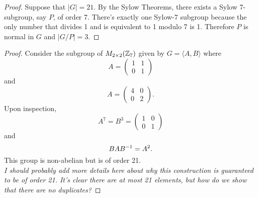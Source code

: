 \documentclass[../../AlgebraQualSolutions.tex]{subfiles}
\begin{document}
	\begin{proof}
	Suppose that $|G| = 21$. By the Sylow Theorems, there exists a Sylow 7-subgroup, say $P$, of order 7. There's exactly one Sylow-7 subgroup because the only number that divides 1 and is equivalent to 1 modulo 7 is 1. Therefore $P$ is normal in $G$ and $|G/P| = 3$.
	\end{proof}
	
	\begin{proof}
	Consider the subgroup of $M_{2\times2}(\mathbb{Z}_7)$ given by $G = \langle A, B \rangle$ where
		\[ A = \begin{pmatrix}
		1 & 1 \\
		0 & 1 \end{pmatrix} \]
	and
		\[ A = \begin{pmatrix}
		4 & 0 \\
		0 & 2 \end{pmatrix}. \]
	Upon inspection, 
		\[ A^7 = B^3 = \begin{pmatrix} 1 & 0 \\ 0 & 1 \end{pmatrix} \]
	and
		\[BAB^{-1} = A^2. \]
	This group is non-abelian but is of order 21.\\
	
	\emph{I should probably add more details here about why this construction is guaranteed to be of order 21. It's clear there are at most 21 elements, but how do we show that there are no duplicates?}
	\end{proof}
\end{document}

